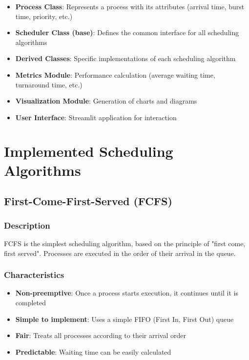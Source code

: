 \documentclass[12pt,a4paper]{article}
\begin{document}
\begin{itemize}
    \item \textbf{Process Class}: Represents a process with its attributes (arrival time, burst time, priority, etc.)
    \item \textbf{Scheduler Class (base)}: Defines the common interface for all scheduling algorithms
    \item \textbf{Derived Classes}: Specific implementations of each scheduling algorithm
    \item \textbf{Metrics Module}: Performance calculation (average waiting time, turnaround time, etc.)
    \item \textbf{Visualization Module}: Generation of charts and diagrams
    \item \textbf{User Interface}: Streamlit application for interaction
\end{itemize}

\section{Implemented Scheduling Algorithms}
\subsection{First-Come-First-Served (FCFS)}
\subsubsection{Description}
FCFS is the simplest scheduling algorithm, based on the principle of "first come, first served". Processes are executed in the order of their arrival in the queue.

\subsubsection{Characteristics}
\begin{itemize}
    \item \textbf{Non-preemptive}: Once a process starts execution, it continues until it is completed
    \item \textbf{Simple to implement}: Uses a simple FIFO (First In, First Out) queue
    \item \textbf{Fair}: Treats all processes according to their arrival order
    \item \textbf{Predictable}: Waiting time can be easily calculated
\end{itemize}
\end{document}
